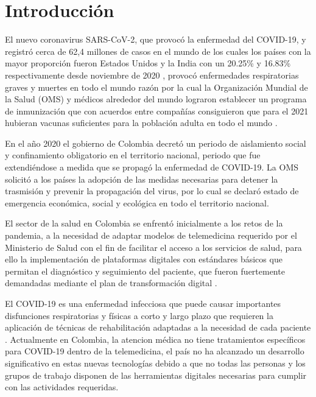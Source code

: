 \documentclass[12pt]{article}
\begin{document}
\newpage












\section{Introducción}


El nuevo coronavirus SARS-CoV-2, que provocó la enfermedad del COVID-19, y registró cerca de 62,4 millones de casos en el mundo de los cuales los pa\'ises con la mayor proporci\'on fueron Estados Unidos y la  India con un 20.25\% y 16.83\% respectivamente desde noviembre de 2020 \cite{6}, provocó enfermedades respiratorias graves y muertes en todo el mundo \cite{7} razón por la cual la Organización Mundial de la Salud (OMS) y médicos alrededor del mundo lograron establecer un programa de inmunización que con acuerdos entre compañías consiguieron que para el 2021 hubieran vacunas suficientes para la población adulta en todo el mundo \cite{30}. 

En el año 2020 el gobierno de Colombia decretó un periodo de aislamiento social y confinamiento obligatorio en el territorio nacional, periodo que fue extendiéndose a medida que se propagó la enfermedad de COVID-19. La OMS solicitó a los países la adopción de las medidas necesarias para detener la trasmisión y prevenir la propagación del virus, por lo cual se declaró estado de emergencia económica, social y ecológica en todo el territorio nacional.

El sector de la salud en Colombia se enfrentó inicialmente a los retos de la pandemia, a la necesidad de adaptar modelos de telemedicina requerido por el Ministerio de Salud con el fin de facilitar el acceso a los servicios de salud, para ello la implementación de plataformas digitales con estándares básicos que permitan el diagnóstico y seguimiento del paciente, que fueron fuertemente demandadas mediante el plan de transformación digital \cite{31}.

El COVID-19 es una enfermedad infecciosa que puede causar importantes disfunciones respiratorias y físicas a corto y largo plazo que requieren la aplicación de técnicas de rehabilitación adaptadas a la necesidad de cada paciente \cite{32}. Actualmente en Colombia, la atencion médica no tiene tratamientos espec\'ificos para COVID-19 dentro de la telemedicina, el pa\'is no ha alcanzado un desarrollo significativo en estas nuevas tecnolog\'ias debido a que no todas las personas y los grupos de trabajo disponen de las herramientas digitales necesarias para cumplir con las actividades requeridas. 
\end{document}
